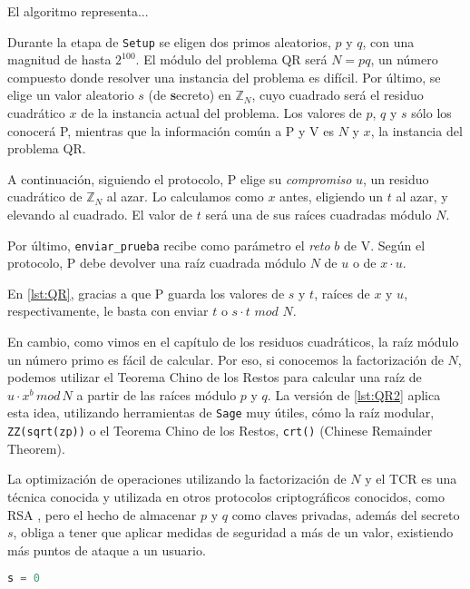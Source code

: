 El algoritmo representa...

Durante la etapa de \texttt{Setup} se eligen dos primos aleatorios, $p$ y $q$, con una magnitud de hasta $2^{100}$. El módulo del problema QR será $N=pq$, un número compuesto donde resolver una instancia del problema es difícil. Por último, se elige un valor aleatorio $s$ (de \textbf{s}ecreto) en $\mathbb{Z}_N$, cuyo cuadrado será el residuo cuadrático $x$ de la instancia actual del problema. Los valores de $p$, $q$ y $s$ sólo los conocerá P, mientras que la información común a P y V es $N$ y $x$, la instancia del problema QR.

A continuación, siguiendo el protocolo, P elige su \textit{compromiso} $u$, un residuo cuadrático de $\mathbb{Z}_N$ al azar. Lo calculamos como $x$ antes, eligiendo un $t$ al azar, y elevando al cuadrado. El valor de $t$ será una de sus raíces cuadradas módulo $N$.

Por último, \texttt{enviar\_prueba} recibe como parámetro el \textit{reto} $b$ de V. Según el protocolo, P debe devolver una raíz cuadrada módulo $N$ de $u$ o de $x\cdot u$.

En \autoref{lst:QR}, gracias a que P guarda los valores de $s$ y $t$, raíces de $x$ y $u$, respectivamente, le basta con enviar $t$ o $s\cdot t$ $mod$ $N$.

En cambio, como vimos en el capítulo de los residuos cuadráticos, la raíz módulo un número primo es fácil de calcular. Por eso, si conocemos la factorización de $N$, podemos utilizar el Teorema Chino de los Restos para calcular una raíz de $u\cdot x^b \, mod \, N$ a partir de las raíces módulo $p$ y $q$. La versión de \autoref{lst:QR2} aplica esta idea, utilizando herramientas de \texttt{Sage} muy útiles, cómo la raíz modular, \texttt{ZZ(sqrt(zp))} o el Teorema Chino de los Restos, \texttt{crt()} (Chinese Remainder Theorem).

\hfil

La optimización de operaciones utilizando la factorización de $N$ y el TCR es una técnica conocida y utilizada en otros protocolos criptográficos conocidos, como RSA \citep{book:1210287}, pero el hecho de almacenar $p$ y $q$ como claves privadas, además del secreto $s$, obliga a tener que aplicar medidas de seguridad a más de un valor, existiendo más puntos de ataque a un usuario.





\begin{lstlisting}[language=Python,frame=tb,caption={AUX},label=lst:AUX]
s = 0
\end{lstlisting}